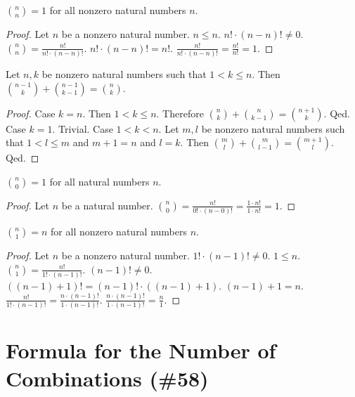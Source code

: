 \documentclass{article}
\begin{document}
\begin{forthel}
\begin{lemma}
$\binom{n}{n} = 1$ for all nonzero natural numbers $n$.
\end{lemma}
\begin{proof}
Let $n$ be a nonzero natural number.
$n \leq n.$
$n! \cdot (n-n)! \neq 0$.
$\binom{n}{n} = \frac{n!}{n! \cdot (n-n)!}$.
$n! \cdot (n-n)! = n!$.
$\frac{n!}{n! \cdot (n-n)!} = \frac{n!}{n!} = 1$.
\end{proof}


\begin{lemma}
Let $n,k$ be nonzero natural numbers such that $1 < k \leq n$.
Then $\binom{n-1}{k} + \binom{n-1}{k-1} = \binom{n}{k}$.
\end{lemma}
\begin{proof}
Case $k = n$.
Then $1 < k \leq n$.
Therefore $\binom{n}{k} + \binom{n}{k-1} = \binom{n+1}{k}$.
Qed.
Case $k = 1$. Trivial.
Case $1 < k < n$.
Let $m,l$ be nonzero natural numbers 
such that $1 < l \leq m$ and $m+1 =n$ and $l = k$.
Then $\binom{m}{l} + \binom{m}{l-1} = \binom{m+1}{l}$.
Qed.
\end{proof}

\begin{lemma}
$\binom{n}{0}=1$ for all natural numbers $n$.
\end{lemma}
\begin{proof}
Let $n$ be a natural number.
$\binom{n}{0} 
= \frac{n!}{0! \cdot (n-0)!} 
= \frac{1 \cdot n!}{1 \cdot n!} 
= 1$.
\end{proof}

\begin{lemma}
$\binom{n}{1}=n$ for all nonzero natural numbers $n$.
\end{lemma}
\begin{proof}
Let $n$ be a nonzero natural number.
$1! \cdot (n-1)! \neq 0$.
$1 \leq n$.
$\binom{n}{1} = \frac{n!}{1! \cdot (n-1)!}$.
$(n-1)! \neq 0$.
$((n-1)+1)! = (n-1)! \cdot ((n-1)+1)$.
$(n-1)+1 = n$.
$\frac{n!}{1! \cdot (n-1)!} 
= \frac{n \cdot (n-1)!}{1 \cdot (n-1)!}$.
$\frac{n \cdot (n-1)!}{1 \cdot (n-1)!}
= \frac{n}{1}$.
\end{proof}

\end{forthel}

\section{Formula for the Number of Combinations (\#58)}
\end{document}
